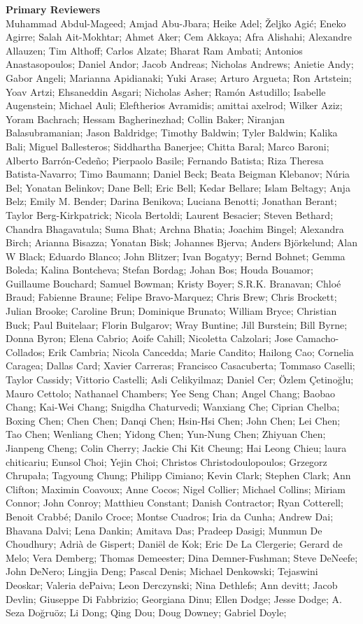 \documentclass[11pt]{article}
\begin{document}
{\bf Primary Reviewers} \\
Muhammad Abdul-Mageed; Amjad Abu-Jbara; Heike Adel; Željko Agić; Eneko Agirre; Salah Ait-Mokhtar; Ahmet Aker; Cem Akkaya; Afra Alishahi; Alexandre Allauzen; Tim Althoff; Carlos Alzate; Bharat Ram Ambati; Antonios Anastasopoulos; Daniel Andor; Jacob Andreas; Nicholas Andrews; Anietie Andy; Gabor Angeli; Marianna Apidianaki; Yuki Arase; Arturo Argueta; Ron Artstein; Yoav Artzi; Ehsaneddin Asgari; Nicholas Asher; Ramón Astudillo; Isabelle Augenstein; Michael Auli; Eleftherios Avramidis; amittai axelrod; Wilker Aziz; Yoram Bachrach; Hessam Bagherinezhad; Collin Baker; Niranjan Balasubramanian; Jason Baldridge; Timothy Baldwin; Tyler Baldwin; Kalika Bali; Miguel Ballesteros; Siddhartha Banerjee; Chitta Baral; Marco Baroni; Alberto Barrón-Cedeño; Pierpaolo Basile; Fernando Batista; Riza Theresa Batista-Navarro; Timo Baumann; Daniel Beck; Beata Beigman Klebanov; Núria Bel; Yonatan Belinkov; Dane Bell; Eric Bell; Kedar Bellare; Islam Beltagy; Anja Belz; Emily M. Bender; Darina Benikova; Luciana Benotti; Jonathan Berant; Taylor Berg-Kirkpatrick; Nicola Bertoldi; Laurent Besacier; Steven Bethard; Chandra Bhagavatula; Suma Bhat; Archna Bhatia; Joachim Bingel; Alexandra Birch; Arianna Bisazza; Yonatan Bisk; Johannes Bjerva; Anders Björkelund; Alan W Black; Eduardo Blanco; John Blitzer; Ivan Bogatyy; Bernd Bohnet; Gemma Boleda; Kalina Bontcheva; Stefan Bordag; Johan Bos; Houda Bouamor; Guillaume Bouchard; Samuel Bowman; Kristy Boyer; S.R.K. Branavan; Chloé Braud; Fabienne Braune; Felipe Bravo-Marquez; Chris Brew; Chris Brockett; Julian Brooke; Caroline Brun; Dominique Brunato; William Bryce; Christian Buck; Paul Buitelaar; Florin Bulgarov; Wray Buntine; Jill Burstein; Bill Byrne; Donna Byron; Elena Cabrio; Aoife Cahill; Nicoletta Calzolari; Jose Camacho-Collados; Erik Cambria; Nicola Cancedda; Marie Candito; Hailong Cao; Cornelia Caragea; Dallas Card; Xavier Carreras; Francisco Casacuberta; Tommaso Caselli; Taylor Cassidy; Vittorio Castelli; Asli Celikyilmaz; Daniel Cer; Özlem Çetinoğlu; Mauro Cettolo; Nathanael Chambers; Yee Seng Chan; Angel Chang; Baobao Chang; Kai-Wei Chang; Snigdha Chaturvedi; Wanxiang Che; Ciprian Chelba; Boxing Chen; Chen Chen; Danqi Chen; Hsin-Hsi Chen; John Chen; Lei Chen; Tao Chen; Wenliang Chen; Yidong Chen; Yun-Nung Chen; Zhiyuan Chen; Jianpeng Cheng; Colin Cherry; Jackie Chi Kit Cheung; Hai Leong Chieu; laura chiticariu; Eunsol Choi; Yejin Choi; Christos Christodoulopoulos; Grzegorz Chrupała; Tagyoung Chung; Philipp Cimiano; Kevin Clark; Stephen Clark; Ann Clifton; Maximin Coavoux; Anne Cocos; Nigel Collier; Michael Collins; Miriam Connor; John Conroy; Matthieu Constant; Danish Contractor; Ryan Cotterell; Benoit Crabbé; Danilo Croce; Montse Cuadros; Iria da Cunha; Andrew Dai; Bhavana Dalvi; Lena Dankin; Amitava Das; Pradeep Dasigi; Munmun De Choudhury; Adrià de Gispert; Daniël de Kok; Eric De La Clergerie; Gerard de Melo; Vera Demberg; Thomas Demeester; Dina Demner-Fushman; Steve DeNeefe; John DeNero; Lingjia Deng; Pascal Denis; Michael Denkowski; Tejaswini Deoskar; Valeria dePaiva; Leon Derczynski; Nina Dethlefs; Ann devitt; Jacob Devlin; Giuseppe Di Fabbrizio; Georgiana Dinu; Ellen Dodge; Jesse Dodge; A. Seza Doğruöz; Li Dong; Qing Dou; Doug Downey; Gabriel Doyle; 
\end{document}
